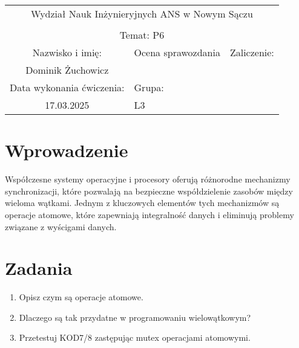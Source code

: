 \documentclass{article}
\begin{document}
\sloppy
\begin{center}
    \small
        \renewcommand{\arraystretch}{1.3} %
        \setlength{\tabcolsep}{20pt} %
        \begin{tabular}{|c|c|c|}
            \hline %
            \multicolumn{3}{|c|}{\large Wydział Nauk Inżynieryjnych ANS w Nowym Sączu}   \\
            \multicolumn{3}{|c|}{\large }   \\
            \hline %
            \multicolumn{3}{|c|}{\large Temat: P6} \\
            \hline %
            \large Nazwisko i imię: & \large Ocena sprawozdania & \large Zaliczenie:\\
            \cline{2-3}
            \large Dominik Żuchowicz & & \\
            \hline
            \large Data wykonania ćwiczenia:&\multicolumn{2}{l|}{\large Grupa:}\\
            \large  17.03.2025 &\multicolumn{2}{l|}{\large L3}\\
            \hline
        \end{tabular}
    \end{center}

    \section*{Wprowadzenie}
    Współczesne systemy operacyjne i procesory oferują różnorodne mechanizmy synchronizacji, które pozwalają na bezpieczne współdzielenie zasobów między wieloma wątkami. Jednym z kluczowych elementów tych mechanizmów są operacje atomowe, które zapewniają integralność danych i eliminują problemy związane z wyścigami danych.

    \section*{Zadania}
        \begin{enumerate}
            
            \item Opisz czym są operacje atomowe.
            \item Dlaczego są tak przydatne w programowaniu wielowątkowym?
            \item Przetestuj KOD7/8 zastępując mutex operacjami atomowymi.
        \end{enumerate}
\end{document}
